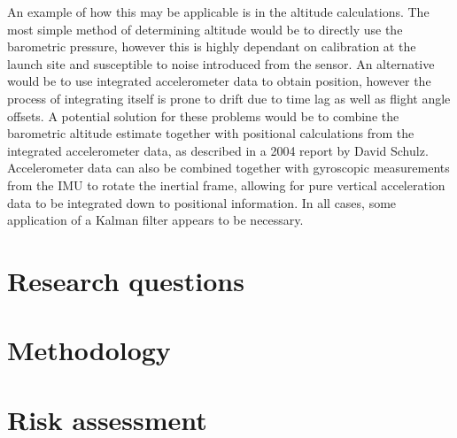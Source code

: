 An example of how this may be applicable is in the altitude calculations. The most simple method of determining altitude would be to directly use the barometric pressure, however this is highly dependant on calibration at the launch site and susceptible to noise introduced from the sensor. An alternative would be to use integrated accelerometer data to obtain position, however the process of integrating itself is prone to drift due to time lag as well as flight angle offsets. A potential solution for these problems would be to combine the barometric altitude estimate together with positional calculations from the integrated accelerometer data, as described in a 2004 report by David Schulz\cite{kalman-apogee}. Accelerometer data can also be combined together with gyroscopic measurements from the IMU to rotate the inertial frame, allowing for pure vertical acceleration data to be integrated down to positional information. In all cases, some application of a Kalman filter appears to be necessary.

\section{Research questions}
\section{Methodology}
\section{Risk assessment}


